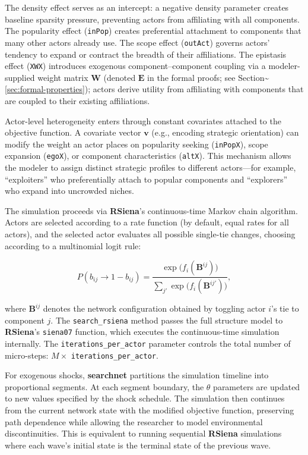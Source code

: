 \documentclass[
]{article}
\begin{document}
The density effect serves as an intercept: a negative density parameter
creates baseline sparsity pressure, preventing actors from affiliating
with all components. The popularity effect (\texttt{inPop}) creates
preferential attachment to components that many other actors already
use. The scope effect (\texttt{outAct}) governs actors' tendency to
expand or contract the breadth of their affiliations. The epistasis
effect (\texttt{XWX}) introduces exogenous component--component coupling
via a modeler-supplied weight matrix \(\mathbf{W}\) (denoted
\(\mathbf{E}\) in the formal proofs; see
Section\textasciitilde{}\ref{sec:formal-properties}); actors derive
utility from affiliating with components that are coupled to their
existing affiliations.

Actor-level heterogeneity enters through constant covariates attached to
the objective function. A covariate vector \(\mathbf{v}\) (e.g.,
encoding strategic orientation) can modify the weight an actor places on
popularity seeking (\texttt{inPopX}), scope expansion (\texttt{egoX}),
or component characteristics (\texttt{altX}). This mechanism allows the
modeler to assign distinct strategic profiles to different actors---for
example, ``exploiters'' who preferentially attach to popular components
and ``explorers'' who expand into uncrowded niches.

The simulation proceeds via \textbf{RSiena}'s continuous-time Markov
chain algorithm. Actors are selected according to a rate function (by
default, equal rates for all actors), and the selected actor evaluates
all possible single-tie changes, choosing according to a multinomial
logit rule:

\begin{equation}\label{eq:choice}
  P(b_{ij} \to 1 - b_{ij}) =
  \frac{\exp\bigl(f_i(\mathbf{B}^{ij})\bigr)}
       {\sum_{j'} \exp\bigl(f_i(\mathbf{B}^{ij'})\bigr)},
\end{equation}

\noindent where \(\mathbf{B}^{ij}\) denotes the network configuration
obtained by toggling actor \(i\)'s tie to component \(j\). The
\texttt{search\_rsiena} method passes the full structure model to
\textbf{RSiena}'s \texttt{siena07} function, which executes the
continuous-time simulation internally. The
\texttt{iterations\_per\_actor} parameter controls the total number of
micro-steps: \(M \times\) \texttt{iterations\_per\_actor}.

For exogenous shocks, \textbf{searchnet} partitions the simulation
timeline into proportional segments. At each segment boundary, the
\(\theta\) parameters are updated to new values specified by the shock
schedule. The simulation then continues from the current network state
with the modified objective function, preserving path dependence while
allowing the researcher to model environmental discontinuities. This is
equivalent to running sequential \textbf{RSiena} simulations where each
wave's initial state is the terminal state of the previous wave.
\end{document}
